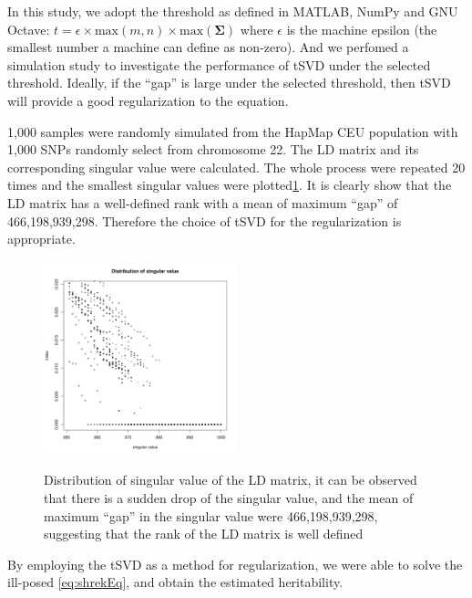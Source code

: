 \documentclass{book}
\begin{document}
			In this study, we adopt the threshold as defined in MATLAB, NumPy and GNU Octave: $t=\epsilon\times\mathrm{max}(m,n)\times\mathrm{max}(\boldsymbol{\Sigma})$ where $\epsilon$ is the machine epsilon (the smallest number a machine can define as non-zero). 
			And we perfomed a simulation study to investigate the performance of \gls{tSVD} under the selected threshold.
			Ideally, if the ``gap'' is large under the selected threshold, then \gls{tSVD} will provide a good regularization to the equation. 
			
			1,000 samples were randomly simulated from the HapMap\citep{Altshuler2010} \acrshort{CEU} population with
			1,000 \glspl{SNP} randomly select from chromosome 22. 
			The \gls{LD} matrix and its corresponding singular value were calculated. 
			The whole process were repeated 20 times and the smallest singular values were plotted\cref{fig:singularValueDist}. 
			It is clearly show that the \gls{LD} matrix has a well-defined rank with a mean of maximum ``gap'' of 466,198,939,298.
			Therefore the choice of \gls{tSVD} for the regularization is appropriate.
			\begin{figure}
				\caption[Distribution of singular value of the LD matrix]{Distribution of singular value of the LD matrix, it can be observed that there is a sudden drop of the singular value, and the mean of maximum ``gap'' in the singular value were 466,198,939,298, suggesting that the rank of the LD matrix is well defined}
				\centering
				\includegraphics[width=0.5\textwidth]{figure/singular_value_distribution.png}
				\label{fig:singularValueDist}
			\end{figure}
			
			By employing the \gls{tSVD} as a method for regularization, we were able to solve the ill-posed \cref{eq:shrekEq}, and obtain the estimated heritability.
			
			
	
\end{document}
